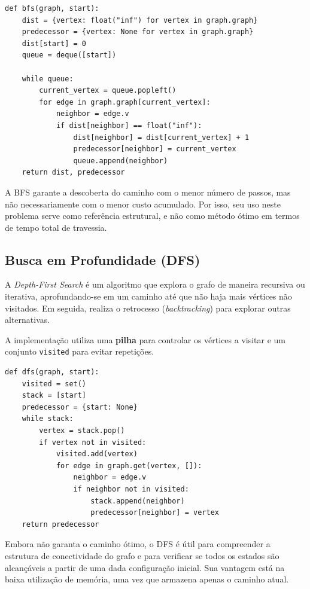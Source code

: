 \documentclass[12pt,a4paper]{article}
\begin{document}
\begin{lstlisting}[caption={Trecho simplificado da função BFS.}]
def bfs(graph, start):
    dist = {vertex: float("inf") for vertex in graph.graph}
    predecessor = {vertex: None for vertex in graph.graph}
    dist[start] = 0
    queue = deque([start])
    
    while queue:
        current_vertex = queue.popleft()
        for edge in graph.graph[current_vertex]:
            neighbor = edge.v
            if dist[neighbor] == float("inf"):
                dist[neighbor] = dist[current_vertex] + 1
                predecessor[neighbor] = current_vertex
                queue.append(neighbor)
    return dist, predecessor
\end{lstlisting}

A BFS garante a descoberta do caminho com o menor número de passos, mas não necessariamente com o menor custo acumulado. Por isso, seu uso neste problema serve como referência estrutural, e não como método ótimo em termos de tempo total de travessia.

\subsection{Busca em Profundidade (DFS)}
A \textit{Depth-First Search} é um algoritmo que explora o grafo de maneira recursiva ou iterativa, aprofundando-se em um caminho até que não haja mais vértices não visitados. Em seguida, realiza o retrocesso (\textit{backtracking}) para explorar outras alternativas.

A implementação utiliza uma \textbf{pilha} para controlar os vértices a visitar e um conjunto \texttt{visited} para evitar repetições.

\begin{lstlisting}[caption={Trecho simplificado da função DFS.}]
def dfs(graph, start):
    visited = set()
    stack = [start]
    predecessor = {start: None}
    while stack:
        vertex = stack.pop()
        if vertex not in visited:
            visited.add(vertex)
            for edge in graph.get(vertex, []):
                neighbor = edge.v
                if neighbor not in visited:
                    stack.append(neighbor)
                    predecessor[neighbor] = vertex
    return predecessor
\end{lstlisting}

Embora não garanta o caminho ótimo, o DFS é útil para compreender a estrutura de conectividade do grafo e para verificar se todos os estados são alcançáveis a partir de uma dada configuração inicial. Sua vantagem está na baixa utilização de memória, uma vez que armazena apenas o caminho atual.
\end{document}
